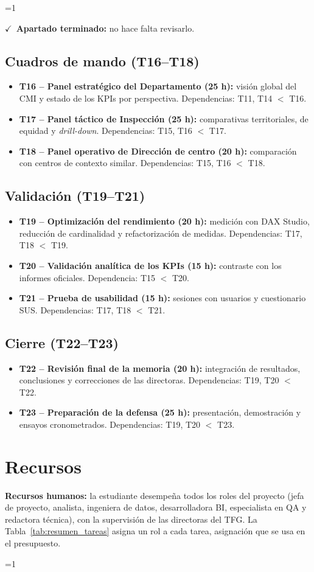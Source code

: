 \documentclass[12pt, a4paper, oneside]{report}
\newcommand{\mostrarterminados}{1}
\newenvironment{revisado}
  {\ifnum\mostrarterminados=1\relax\begin{cajarevisada}\noindent\colorbox{verdeterminado}{\parbox{\dimexpr\linewidth-2\fboxsep\relax}{\small$\checkmark$\ \textbf{Apartado terminado:} no hace falta revisarlo.}}\par\medskip\fi}
  {\ifnum\mostrarterminados=1\relax\end{cajarevisada}\fi}
\begin{document}
\begin{revisado}
\subsection{Cuadros de mando (T16--T18)}
\begin{itemize}
    \item \textbf{T16 -- Panel estratégico del Departamento (25 h):} visión global del CMI y estado de los KPIs por perspectiva. Dependencias: T11, T14 $<$ T16.
    \item \textbf{T17 -- Panel táctico de Inspección (25 h):} comparativas territoriales, de equidad y \textit{drill-down}. Dependencias: T15, T16 $<$ T17.
    \item \textbf{T18 -- Panel operativo de Dirección de centro (20 h):} comparación con centros de contexto similar. Dependencias: T15, T16 $<$ T18.
\end{itemize}

\subsection{Validación (T19--T21)}
\begin{itemize}
    \item \textbf{T19 -- Optimización del rendimiento (20 h):} medición con DAX Studio, reducción de cardinalidad y refactorización de medidas. Dependencias: T17, T18 $<$ T19.
    \item \textbf{T20 -- Validación analítica de los KPIs (15 h):} contraste con los informes oficiales. Dependencia: T15 $<$ T20.
    \item \textbf{T21 -- Prueba de usabilidad (15 h):} sesiones con usuarios y cuestionario SUS. Dependencias: T17, T18 $<$ T21.
\end{itemize}

\subsection{Cierre (T22--T23)}
\begin{itemize}
    \item \textbf{T22 -- Revisión final de la memoria (20 h):} integración de resultados, conclusiones y correcciones de las directoras. Dependencias: T19, T20 $<$ T22.
    \item \textbf{T23 -- Preparación de la defensa (25 h):} presentación, demostración y ensayos cronometrados. Dependencias: T19, T20 $<$ T23.
\end{itemize}

\section{Recursos}
\textbf{Recursos humanos:} la estudiante desempeña todos los roles del proyecto (jefa de proyecto, analista, ingeniera de datos, desarrolladora BI, especialista en QA y redactora técnica), con la supervisión de las directoras del TFG. La Tabla~\ref{tab:resumen_tareas} asigna un rol a cada tarea, asignación que se usa en el presupuesto.


\end{revisado}
\end{document}
